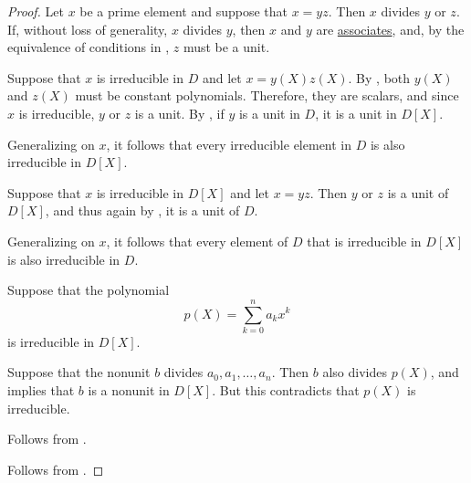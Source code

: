 \begin{proof}
   Let \( x \) be a prime element and suppose that \( x = yz \). Then \( x \) divides \( y \) or \( z \). If, without loss of generality, \( x \) divides \( y \), then \( x \) and \( y \) are \hyperref[def:domain_divisibility/associates]{associates}, and, by the equivalence of conditions in , \( z \) must be a unit.


  \SufficiencySubProof* Suppose that \( x \) is irreducible in \( D \) and let \( x = y(X) z(X) \). By , both \( y(X) \) and \( z(X) \) must be constant polynomials. Therefore, they are scalars, and since \( x \) is irreducible, \( y \) or \( z \) is a unit. By , if \( y \) is a unit in \( D \), it is a unit in \( D[X] \).

  Generalizing on \( x \), it follows that every irreducible element in \( D \) is also irreducible in \( D[X] \).

  \NecessitySubProof* Suppose that \( x \) is irreducible in \( D[X] \) and let \( x = yz \). Then \( y \) or \( z \) is a unit of \( D[X] \), and thus again by , it is a unit of \( D \).

  Generalizing on \( x \), it follows that every element of \( D \) that is irreducible in \( D[X] \) is also irreducible in \( D \).

   Suppose that the polynomial
  \begin{equation*}
    p(X) = \sum_{k=0}^n a_k x^k
  \end{equation*}
  is irreducible in \( D[X] \).

  Suppose that the nonunit \( b \) divides \( a_0, a_1, \ldots, a_n \). Then \( b \) also divides \( p(X) \), and  implies that \( b \) is a nonunit in \( D[X] \). But this contradicts that \( p(X) \) is irreducible.

   Follows from .

   Follows from .
\end{proof}

